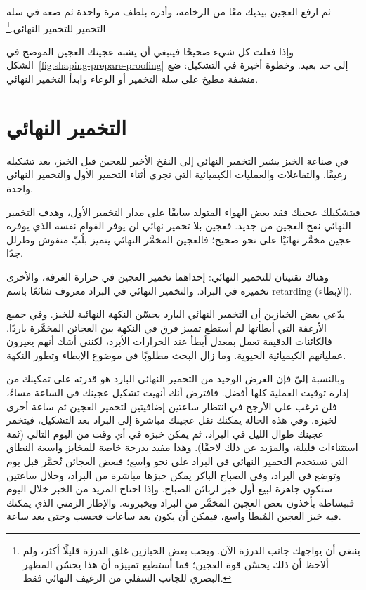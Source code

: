 ثم ارفع العجين بيديك معًا من الرخامة، وأدره بلطف مرة واحدة ثم ضعه في سلة التخمير للتخمير النهائي.\footnote{ينبغي أن يواجهك جانب الدرزة الآن. ويحب بعض الخبازين غلق الدرزة قليلًا أكثر، ولم ألاحظ أن ذلك يحسّن قوة العجين؛ فما أستطيع تمييزه أن هذا يحسّن المظهر البصري للجانب السفلي من الرغيف النهائي فقط.}

وإذا فعلت كل شيء صحيحًا فينبغي أن يشبه عجينك العجين الموضح في الشكل~\ref{fig:shaping-prepare-proofing} إلى حد بعيد. وخطوة أخيرة في التشكيل: ضع منشفة مطبخ على سلة التخمير أو الوعاء وابدأ التخمير النهائي.

\section{التخمير النهائي}

في صناعة الخبز يشير التخمير النهائي إلى النفخ الأخير للعجين قبل الخبز، بعد تشكيله رغيفًا. والتفاعلات والعمليات الكيميائية التي تجري أثناء التخمير الأول والتخمير النهائي واحدة.

فبتشكيلك عجينك فقد بعض الهواء المتولد سابقًا على مدار التخمير الأول، وهدف التخمير النهائي نفخ العجين من جديد. فعجين بلا تخمير نهائي لن يوفر القوام نفسه الذي يوفره عجين مخمَّر نهائيًا على نحو صحيح؛ فالعجين المخمَّر النهائي يتميز بلُبّ منفوش وطرلل جدًا.

وهناك تقنيتان للتخمير النهائي: إحداهما تخمير العجين في حرارة الغرفة، والأخرى تخميره في البراد. والتخمير النهائي في البراد معروف شائعًا باسم \textenglish{retarding} (الإبطاء).

يدّعي بعض الخبازين أن التخمير النهائي البارد يحسّن النكهة النهائية للخبز. وفي جميع الأرغفة التي أبطأتها لم أستطع تمييز فرق في النكهة بين العجائن المخمَّرة باردًا. فالكائنات الدقيقة تعمل بمعدل أبطأ عند الحرارات الأبرد، لكنني أشك أنهم يغيرون عملياتهم الكيميائية الحيوية. وما زال البحث مطلوبًا في موضوع الإبطاء وتطور النكهة.

\begin{flowchart}[!htb]
\centering

\caption[عملية التخمير النهائي للخبز الحامض]{نظرة تخطيطية عامة على الخطوات المختلفة لعملية التخمير النهائي للخبز الحامض. وتقنية التخمير النهائي التي تختارها تتوقف على جدولك ومواصلك.}
\label{fig:proofing-process}
\end{flowchart}

وبالنسبة إليّ فإن الغرض الوحيد من التخمير النهائي البارد هو قدرته على تمكينك من إدارة توقيت العملية كلها أفضل. فافترض أنك أنهيت تشكيل عجينك في الساعة  مساءً، فلن ترغب على الأرجح في انتظار ساعتين إضافيتين لتخمير العجين ثم ساعة أخرى لخبزه. وفي هذه الحالة يمكنك نقل عجينك مباشرة إلى البراد بعد التشكيل، فيتخمر عجينك طوال الليل في البراد، ثم يمكن خبزه في أي وقت من اليوم التالي (ثمة استثناءات قليلة، والمزيد عن ذلك لاحقًا). وهذا مفيد بدرجة خاصة للمخابز واسعة النطاق التي تستخدم التخمير النهائي في البراد على نحو واسع؛ فبعض العجائن تُخمَّر قبل يوم وتوضع في البراد، وفي الصباح الباكر يمكن خبزها مباشرة من البراد، وخلال ساعتين ستكون جاهزة لبيع أول خبز لزبائن الصباح. وإذا احتاج المزيد من الخبز خلال اليوم فببساطة يأخذون بعض العجين المخمَّر من البراد ويخبزونه. والإطار الزمني الذي يمكنك فيه خبز العجين المُبطأ واسع، فيمكن أن يكون بعد  ساعات فحسب وحتى بعد  ساعة.


